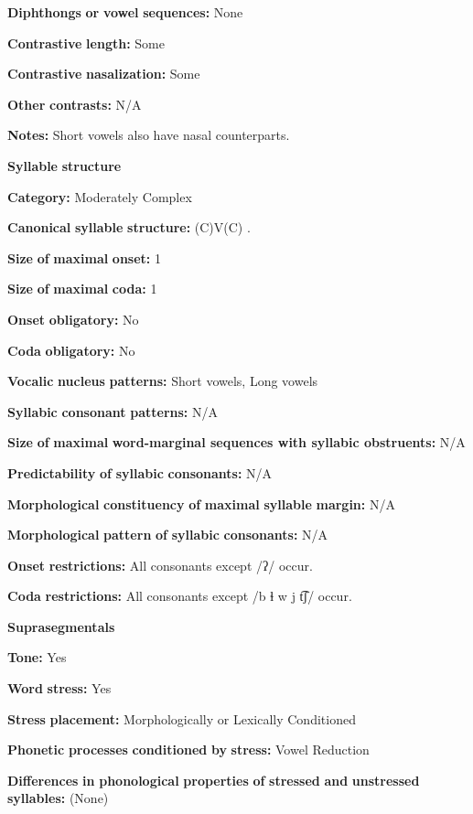 \begin{styleBody}
\textbf{Diphthongs} \textbf{or} \textbf{vowel} \textbf{sequences:} None

\textbf{Contrastive} \textbf{length:} Some

\textbf{Contrastive} \textbf{nasalization:} Some

\textbf{Other} \textbf{contrasts:} N/A

\textbf{Notes:} Short vowels also have nasal counterparts.

\textbf{Syllable} \textbf{structure}

\textbf{Category:} Moderately Complex

\textbf{Canonical} \textbf{syllable} \textbf{structure:} (C)V(C) \citep[18-21]{Broadwell2006}.

\textbf{Size} \textbf{of} \textbf{maximal} \textbf{onset:} 1

\textbf{Size} \textbf{of} \textbf{maximal} \textbf{coda:} 1

\textbf{Onset} \textbf{obligatory:} No

\textbf{Coda} \textbf{obligatory:} No

\textbf{Vocalic} \textbf{nucleus} \textbf{patterns:} Short vowels, Long vowels

\textbf{Syllabic} \textbf{consonant} \textbf{patterns:} N/A

\textbf{Size} \textbf{of} \textbf{maximal} \textbf{word{}-marginal sequences with syllabic obstruents:} N/A

\textbf{Predictability} \textbf{of} \textbf{syllabic} \textbf{consonants:} N/A

\textbf{Morphological} \textbf{constituency} \textbf{of} \textbf{maximal} \textbf{syllable} \textbf{margin:} N/A

\textbf{Morphological} \textbf{pattern} \textbf{of} \textbf{syllabic} \textbf{consonants:} N/A

\textbf{Onset} \textbf{restrictions:} All consonants except /ʔ/ occur.

\textbf{Coda} \textbf{restrictions:} All consonants except /b ɬ w j t͡ʃ/ occur.

\textbf{Suprasegmentals}

\textbf{Tone:} Yes

\textbf{Word} \textbf{stress:} Yes

\textbf{Stress} \textbf{placement:} Morphologically or Lexically Conditioned

\textbf{Phonetic} \textbf{processes} \textbf{conditioned} \textbf{by} \textbf{stress:} Vowel Reduction

\textbf{Differences} \textbf{in} \textbf{phonological} \textbf{properties} \textbf{of} \textbf{stressed} \textbf{and} \textbf{unstressed} \textbf{syllables:} (None)


\end{styleBody}
